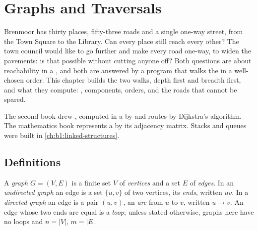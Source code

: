 \chapter{Graphs and Traversals}\label{ch:b1:graph-traversals}

Brenmoor has thirty places, fifty-three roads and a single one-way street, from the Town Square to the Library. Can
every place still reach every other? The town council would like to go further and make every road one-way, to
widen the pavements: is that possible without cutting anyone off? Both questions are about reachability in a ,
and both are answered by a program that walks the  in a well-chosen order. This chapter builds the two walks,
depth first and breadth first, and what they compute: , components, orders, and the roads that cannot be
spared.

\begin{recall}
The second book drew , computed  in a  by  and routes by Dijkstra's
algorithm. The mathematics book represents a  by its adjacency matrix. Stacks and queues were built in
\cref{ch:b1:linked-structures}.
\end{recall}

\section{Definitions}\label{sec:b1:graph-traversals:definitions}

\begin{definition}\label{def:b1:graph-traversals:graph}
A \emph{graph} $G = (V, E)$ is a finite set $V$ of \emph{vertices} and a set $E$ of
\emph{edges}. In an \emph{undirected graph} an edge is a set $\{u, v\}$ of two vertices, its
\emph{ends}, written $uv$. In a \emph{directed graph} an edge is a pair $(u, v)$, an
\emph{arc} from $u$ to $v$, written $u \to v$. An edge whose two ends are equal is a
\emph{loop}; unless stated otherwise, graphs here have no loops and $n = |V|$, $m = |E|$.
\end{definition}

